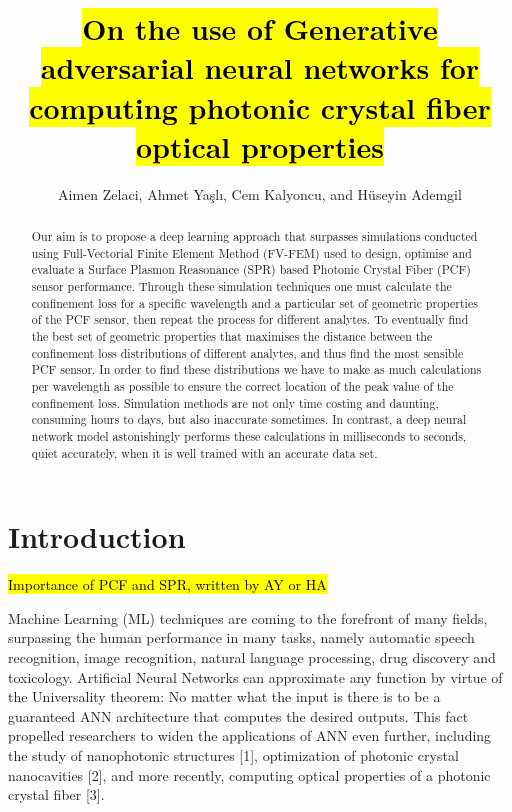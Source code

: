 \documentclass[draft, a4, 10pt, onecolumn]{IEEEtran}
\begin{document}
\title{\hl{On the use of Generative adversarial neural networks for computing photonic crystal fiber optical properties}}

\author{Aimen Zelaci, Ahmet Yaşlı, Cem Kalyoncu, and Hüseyin Ademgil}

\maketitle
	
\begin{abstract}
Our aim is to propose a deep learning approach that surpasses simulations conducted using Full-Vectorial Finite Element Method (FV-FEM) used to design, optimise and evaluate a Surface Plasmon Reasonance (SPR) based Photonic Crystal Fiber (PCF) sensor performance. Through these simulation techniques one must calculate the confinement loss for a specific wavelength and a particular set of geometric properties of the PCF sensor, then repeat the process for different analytes. To eventually find the best set of geometric properties that maximises the distance between the confinement loss distributions of different analytes, and thus find the most sensible PCF sensor. In order to find these distributions we have to make as much calculations per wavelength as possible to ensure the correct location of the peak value of the confinement loss. Simulation methods are not only time costing and daunting, consuming hours to days, but also inaccurate sometimes. In contrast, a deep neural network model astonishingly performs these calculations in milliseconds to seconds, quiet accurately, when it is well trained with an accurate data set.

\end{abstract}

\section{Introduction}

\hl{Importance of PCF and SPR, written by AY or HA}

Machine Learning (ML) techniques are coming to the forefront of many fields, surpassing the human performance in many tasks, namely automatic speech recognition, image recognition, natural language processing, drug discovery and toxicology. Artificial Neural Networks can approximate any function by virtue of the Universality theorem: No matter what the input is there is to be a guaranteed ANN architecture that computes the desired outputs. This fact propelled researchers to widen the applications of ANN even further, including the study of nanophotonic structures [1], optimization of photonic crystal nanocavities [2], and more recently, computing optical properties of a photonic crystal fiber [3].
\end{document}
